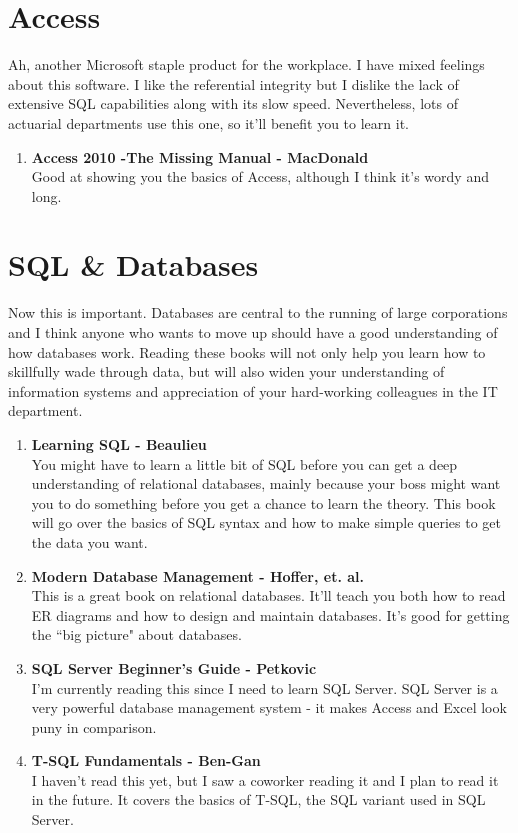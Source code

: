 \documentclass[oneside, titlepage]{article}
\begin{document}
\section{Access}
Ah, another Microsoft staple product for the workplace. I have mixed feelings about this software. I like the referential integrity but I dislike the lack of extensive SQL capabilities along with its slow speed. Nevertheless, lots of actuarial departments use this one, so it'll benefit you to learn it.

\begin{enumerate}
\item{\bfseries Access 2010 -The Missing Manual - MacDonald}\\
Good at showing you the basics of Access, although I think it's wordy and long.
\end{enumerate}

\section{SQL \& Databases}
Now this is important. Databases are central to the running of large corporations and I think anyone who wants to move up should have a good understanding of how databases work. Reading these books will not only help you learn how to skillfully wade through data, but will also widen your understanding of information systems and appreciation of your hard-working colleagues in the IT department.

\begin{enumerate}
\item{\bfseries Learning SQL - Beaulieu}\\
You might have to learn a little bit of SQL before you can get a deep understanding of relational databases, mainly because your boss might want you to do something before you get a chance to learn the theory. This book will go over the basics of SQL syntax and how to make simple queries to get the data you want.

\item{\bfseries Modern Database Management - Hoffer, et. al.}\\
This is a great book on relational databases. It'll teach you both how to read ER diagrams and how to design and maintain databases. It's good for getting the ``big picture" about databases.

\item{\bfseries SQL Server Beginner's Guide - Petkovic}\\
I'm currently reading this since I need to learn SQL Server. SQL Server is a very powerful database management system - it makes Access and Excel look puny in comparison. 

\item{\bfseries T-SQL Fundamentals - Ben-Gan}\\
I haven't read this yet, but I saw a coworker reading it and I plan to read it in the future. It covers the basics of T-SQL, the SQL variant used in SQL Server.
\end{enumerate}
\end{document}
